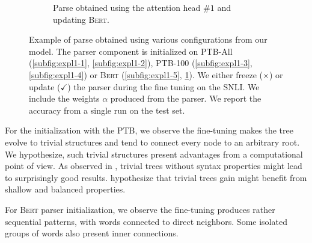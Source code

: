 \begin{figure}[htb!]
\begin{subfigure}[b]{0.475\textwidth}
        \caption{Parse obtained using the attention head \#$1$ and updating \textsc{Bert}.}
        \label{subfig:expl1-6}
    \end{subfigure}
    \caption{Example of parse obtained using various configurations from our model. The parser component is initialized on PTB-All (\ref{subfig:expl1-1}, \ref{subfig:expl1-2}), PTB-100 (\ref{subfig:expl1-3}, \ref{subfig:expl1-4}) or \textsc{Bert} (\ref{subfig:expl1-5}, \ref{subfig:expl1-6}). We either freeze ($\times$) or update ($\checkmark$) the parser during the fine tuning on the SNLI. We include the weights $\alpha$ produced from the parser. 
    We report the accuracy from a single run on the test set.} 
    \label{fig:parse-expl}
\end{figure}

For the initialization with the PTB, we observe the fine-tuning makes the tree evolve to trivial structures and tend to connect every node to an arbitrary root. We hypothesize, such trivial structures present advantages from a computational point of view. As observed in \textcite{shi_18}, trivial trees without syntax properties might lead to surprisingly good results. \textcite{shi_18} hypothesize that trivial trees gain might benefit from shallow and balanced properties. 

For \textsc{Bert} parser initialization, we observe the fine-tuning produces rather sequential patterns, with words connected to direct neighbors. Some isolated groups of words also present inner connections.






